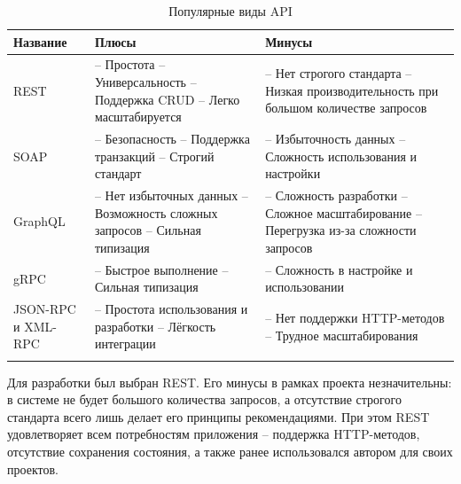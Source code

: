 \documentclass[a4paper,article]{article}
\begin{document}
\begin{sloppypar}
    \begin{xltabular}{\textwidth} { |
            >{\hsize} X |
            >{\hsize} X |
            >{\hsize} X | }
        \hline
        Название
        & Плюсы
        & Минусы \\
        \hline
        REST
        & -- Простота \newline -- Универсальность \newline -- Поддержка CRUD \newline -- Легко масштабируется
        & -- Нет строгого стандарта \newline -- Низкая производительность при большом количестве запросов \\
        \hline
        SOAP
        & -- Безопасность \newline -- Поддержка транзакций \newline -- Строгий стандарт
        & -- Избыточность данных \newline -- Сложность использования и настройки \\
        \hline
        GraphQL
        & -- Нет избыточных данных \newline -- Возможность сложных запросов \newline -- Сильная типизация
        & -- Сложность разработки \newline -- Сложное масштабирование \newline -- Перегрузка из-за сложности запросов \\
        \hline
        gRPC
        & -- Быстрое выполнение \newline -- Сильная типизация
        & -- Сложность в настройке и использовании \\
        \hline
        JSON-RPC и XML-RPC
        & -- Простота использования и разработки \newline -- Лёгкость интеграции
        & -- Нет поддержки HTTP-методов \newline -- Трудное масштабирования \\
        \hline

        \caption{\centering Популярные виды API}

        \label{tab:Популярные виды API}
    \end{xltabular}

    Для разработки был выбран REST. Его минусы в рамках проекта незначительны: в системе не будет большого количества запросов, а отсутствие строгого стандарта всего лишь делает его принципы рекомендациями. При этом REST удовлетворяет всем потребностям приложения -- поддержка HTTP-методов, отсутствие сохранения состояния, а также ранее использовался автором для своих проектов.


\end{sloppypar}
\end{document}
